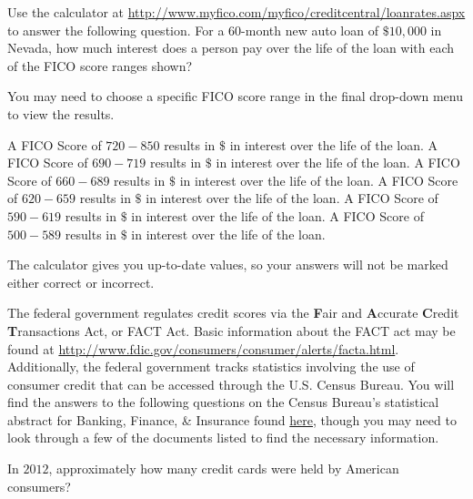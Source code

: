 \documentclass{ximera}
\begin{document}
\begin{question}
Use the calculator at \href{http://www.myfico.com/myfico/creditcentral/loanrates.aspx}{http://www.myfico.com/myfico/creditcentral/loanrates.aspx} to answer the following question. For a 60-month new auto loan of $\$10,000$ in Nevada, how much interest does a person pay over the life of the loan with each of the FICO score ranges shown?
\begin{hint}
You may need to choose a specific FICO score range in the final drop-down menu to view the results.
\end{hint}

A FICO Score of $720-850$ results in $\$$\answer{} in interest over the life of the loan.
A FICO Score of $690-719$ results in $\$$\answer{} in interest over the life of the loan.
A FICO Score of $660-689$ results in $\$$\answer{} in interest over the life of the loan.
A FICO Score of $620-659$ results in $\$$\answer{} in interest over the life of the loan.
A FICO Score of $590-619$ results in $\$$\answer{} in interest over the life of the loan.
A FICO Score of $500-589$ results in $\$$\answer{} in interest over the life of the loan.

\begin{hint}
The calculator gives you up-to-date values, so your answers will not be marked either correct or incorrect.
\end{hint}

\end{question}

The federal government regulates credit scores via the \textbf{F}air and \textbf{A}ccurate \textbf{C}redit \textbf{T}ransactions Act, or FACT Act. Basic information about the FACT act may be found at \href{http://www.fdic.gov/consumers/consumer/alerts/facta.html}{http://www.fdic.gov/consumers/consumer/alerts/facta.html}. Additionally, the federal government tracks statistics involving the use of consumer credit that can be accessed through the U.S. Census Bureau. You will find the answers to the following questions on the Census Bureau's statistical abstract for Banking, Finance, \& Insurance found \href{http://www.census.gov/compendia/statab/cats/banking_finance_insurance/payment_systems_consumer_credit_mortgage_debt.html}{here}, though you may need to look through a few of the documents listed to find the necessary information.


\begin{question}
In $2012$, approximately how many credit cards were held by American consumers?
    \begin{multipleChoice}
    \end{multipleChoice}
\end{question}
\end{document}
